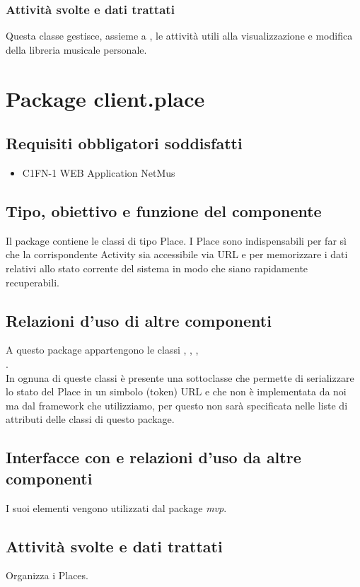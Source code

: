 \subsubsection*{Attivit\`a svolte e dati trattati}
Questa classe gestisce, assieme a , le attivit\`a utili alla
visualizzazione e modifica della libreria musicale personale.


\newpage
\section{Package client.place} %
\subsection*{Requisiti obbligatori soddisfatti}
\begin{itemize}
	\item C1FN-1 WEB Application NetMus
\end{itemize}
\subsection*{Tipo, obiettivo e funzione del componente}
Il package contiene le classi di tipo Place. I Place sono indispensabili
per far s\`i che la corrispondente Activity sia accessibile via URL e per
memorizzare i dati relativi allo stato corrente del sistema in modo che siano
rapidamente recuperabili. 
\subsection*{Relazioni d'uso di altre componenti} A
questo package appartengono le classi , ,
, \\.\\
In ognuna di queste classi \`e presente una sottoclasse  che
permette di serializzare lo stato del Place in un simbolo (token) URL e che non
\`e implementata da noi ma dal framework che utilizziamo, per questo non sar\`a
specificata nelle liste di attributi delle classi di questo package.
\subsection*{Interfacce con
e relazioni d'uso da altre componenti} I suoi elementi vengono utilizzati dal package \emph{mvp}. 
\subsection*{Attivit\`a svolte e dati trattati} Organizza i Places.

